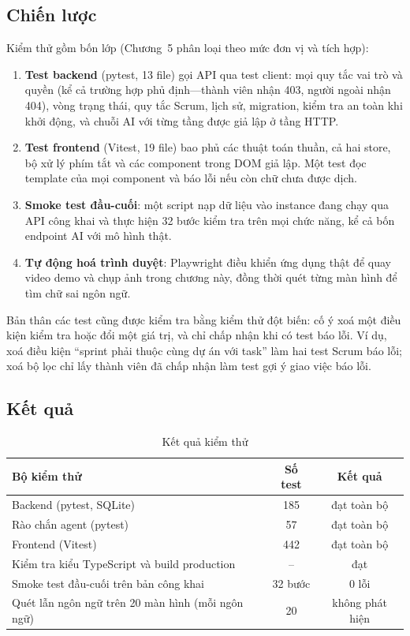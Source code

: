 \documentclass[../main.tex]{subfiles}
\begin{document}
\subsection{Chiến lược}
Kiểm thử gồm bốn lớp (Chương~5 phân loại theo mức đơn vị và tích hợp):
\begin{enumerate}
  \item \textbf{Test backend} (pytest, 13 file) gọi API qua test client: mọi quy tắc vai trò và quyền
        (kể cả trường hợp phủ định---thành viên nhận 403, người ngoài nhận 404), vòng trạng thái, quy
        tắc Scrum, lịch sử, migration, kiểm tra an toàn khi khởi động, và chuỗi AI với từng tầng được
        giả lập ở tầng HTTP.
  \item \textbf{Test frontend} (Vitest, 19 file) bao phủ các thuật toán thuần, cả hai store, bộ xử
        lý phím tắt và các component trong DOM giả lập. Một test đọc template của mọi component và
        báo lỗi nếu còn chữ chưa được dịch.
  \item \textbf{Smoke test đầu-cuối}: một script nạp dữ liệu vào instance đang chạy qua API công khai
        và thực hiện 32 bước kiểm tra trên mọi chức năng, kể cả bốn endpoint AI với mô hình thật.
  \item \textbf{Tự động hoá trình duyệt}: Playwright điều khiển ứng dụng thật để quay video demo và
        chụp ảnh trong chương này, đồng thời quét từng màn hình để tìm chữ sai ngôn ngữ.
\end{enumerate}
Bản thân các test cũng được kiểm tra bằng kiểm thử đột biến: cố ý xoá một điều kiện kiểm tra hoặc
đổi một giá trị, và chỉ chấp nhận khi có test báo lỗi. Ví dụ, xoá điều kiện ``sprint phải thuộc cùng
dự án với task'' làm hai test Scrum báo lỗi; xoá bộ lọc chỉ lấy thành viên đã chấp nhận làm test gợi ý
giao việc báo lỗi.

\subsection{Kết quả}
\begin{table}[H]
\centering
\caption{Kết quả kiểm thử}\label{tab:tests}
\renewcommand{\arraystretch}{1.2}
\begin{tabular}{|p{6.5cm}|c|c|}
\hline
\textbf{Bộ kiểm thử} & \textbf{Số test} & \textbf{Kết quả} \\ \hline
Backend (pytest, SQLite) & 185 & đạt toàn bộ \\ \hline
Rào chắn agent (pytest) & 57 & đạt toàn bộ \\ \hline
Frontend (Vitest) & 442 & đạt toàn bộ \\ \hline
Kiểm tra kiểu TypeScript và build production & -- & đạt \\ \hline
Smoke test đầu-cuối trên bản công khai & 32 bước & 0 lỗi \\ \hline
Quét lẫn ngôn ngữ trên 20 màn hình (mỗi ngôn ngữ) & 20 & không phát hiện \\ \hline
\end{tabular}
\end{table}
\end{document}

